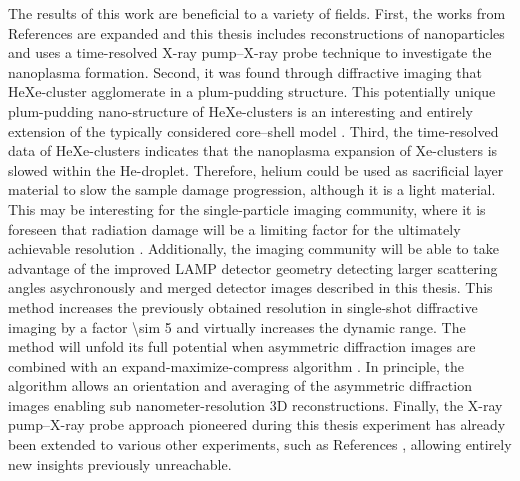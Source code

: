 %
The results of this work are beneficial to a variety of fields. First, the works from References \cite{Hoener-2008-JPB,Gorkhover-2016-NatPho} are expanded and this thesis includes reconstructions of nanoparticles and uses a time-resolved X-ray pump--X-ray probe technique to investigate the nanoplasma formation. Second, it was found through diffractive imaging that HeXe-cluster agglomerate in a plum-pudding structure. This potentially unique plum-pudding nano-structure of HeXe-clusters is an interesting and entirely extension of the typically considered core--shell model \cite{Hau-Riege-2004-PRE,Hau-Riege-2007-PRL,Jurek-2008-EPJ,Jurek-2009-EPL,Hau-Riege-2010-PRL,Hoener-2008-JPB}. Third, the time-resolved data of HeXe-clusters indicates that the nanoplasma expansion of Xe-clusters is slowed within the He-droplet. Therefore, helium could be used as sacrificial layer material to slow the sample damage progression, although it is a light material. This may be interesting for the single-particle imaging community, where it is foreseen that radiation damage will be a limiting factor for the ultimately achievable resolution \citep{Aquila-2015-StrucDyn}. Additionally, the imaging community will be able to take advantage of the improved LAMP detector geometry detecting larger scattering angles asychronously and merged detector images described in this thesis. This method increases the previously obtained resolution in single-shot diffractive imaging by a factor \num{\sim 5} and virtually increases the dynamic range. The method will unfold its full potential when asymmetric diffraction images are combined with an expand-maximize-compress algorithm \citep{Loh-2009-PRE}. In principle, the algorithm allows an orientation and averaging of the asymmetric diffraction images enabling sub nanometer-resolution 3D reconstructions. Finally, the X-ray pump--X-ray probe approach pioneered during this thesis experiment has already been extended to various other experiments, such as References \cite{Lehmann-2016-PRA,Kimberg-2016-FD,Al-Haddad-2017-unpublished,Ferguson-2016-SciAdv,Picon-2016-NatComm}, allowing entirely new insights previously unreachable.
